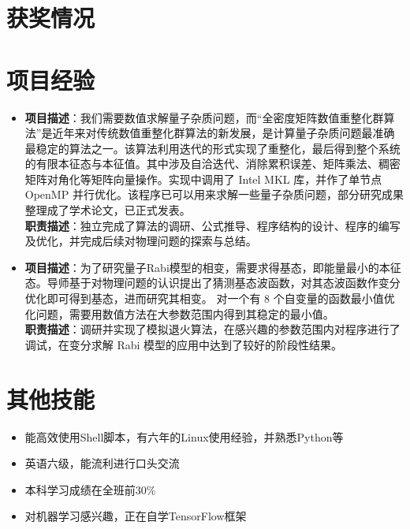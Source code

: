 \documentclass{resume}
\begin{document}
\section{获奖情况}

\section{项目经验}
\begin{itemize}%
\item {}
{\textbf{项目描述}：我们需要数值求解量子杂质问题，而“全密度矩阵数值重整化群算法”是近年来对传统数值重整化群算法的新发展，是计算量子杂质问题最准确最稳定的算法之一。该算法利用迭代的形式实现了重整化，最后得到整个系统的有限本征态与本征值。其中涉及自洽迭代、消除累积误差、矩阵乘法、稠密矩阵对⻆化等矩阵向量操作。实现中调用了 Intel MKL 库，并作了单节点 OpenMP 并行优化。该程序已可以用来求解一些量子杂质问题，部分研究成果整理成了学术论文，已正式发表。}\\
\textbf{职责描述}：独立完成了算法的调研、公式推导、程序结构的设计、程序的编写及优化，并完成后续对物理问题的探索与总结。
\item
{}
\textbf{项目描述}：为了研究量子Rabi模型的相变，需要求得基态，即能量最小的本征态。导师基于对物理问题的认识提出了猜测基态波函数，对其态波函数作变分优化即可得到基态，进而研究其相变。 对一个有 8 个自变量的函数最小值优化问题，需要用数值方法在大参数范围内得到其稳定的最小值。\\
\textbf{职责描述}：调研并实现了模拟退火算法，在感兴趣的参数范围内对程序进行了调试，在变分求解 Rabi 模型的应用中达到了较好的阶段性结果。
\end{itemize}

\section{其他技能}
\begin{itemize}%
\item 能高效使用Shell脚本，有六年的Linux使用经验，并熟悉Python等
\item 英语六级，能流利进行口头交流
\item 本科学习成绩在全班前30\%
\item 对机器学习感兴趣，正在自学TensorFlow框架
\end{itemize}
\end{document}
